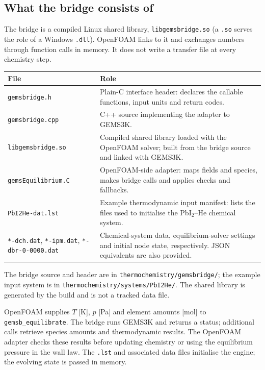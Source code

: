\documentclass[10pt,a4paper]{article}
\begin{document}
\clearpage
\subsection{What the bridge consists of}
The bridge is a compiled Linux shared library, \texttt{libgemsbridge.so}
(a \texttt{.so} serves the role of a Windows \texttt{.dll}). OpenFOAM links
to it and exchanges numbers through function calls in memory. It does
not write a transfer file at every chemistry step.

{\small
\renewcommand{\arraystretch}{1.3}
\begin{tabularx}{\textwidth}{@{}p{4.9cm}>{\raggedright\arraybackslash}X@{}}
\toprule
\textbf{File} & \textbf{Role} \\
\midrule
\texttt{gemsbridge.h} & Plain-C interface header: declares the callable functions, input units and return codes. \\
\texttt{gemsbridge.cpp} & C++ source implementing the adapter to GEMS3K. \\
\texttt{libgemsbridge.so} & Compiled shared library loaded with the OpenFOAM solver; built from the bridge source and linked with GEMS3K. \\
\texttt{gemsEquilibrium.C} & OpenFOAM-side adapter: maps fields and species, makes bridge calls and applies checks and fallbacks. \\
\texttt{PbI2He-dat.lst} & Example thermodynamic input manifest: lists the files used to initialise the PbI$_2$--He chemical system. \\
\texttt{*-dch.dat}, \texttt{*-ipm.dat},\newline
\texttt{*-dbr-0-0000.dat} & Chemical-system data, equilibrium-solver settings and initial node state, respectively. JSON equivalents are also provided. \\
\bottomrule
\end{tabularx}
}

The bridge source and header are in \texttt{thermochemistry/gemsbridge/};
the example input system is in \texttt{thermochemistry/systems/PbI2He/}.
The shared library is generated by the build and is not a tracked data file.

\begin{inshort}
OpenFOAM supplies $T$ [K], $p$ [Pa] and element amounts [mol] to
\texttt{gemsb\_equilibrate}. The bridge runs GEMS3K and returns a status;
additional calls retrieve species amounts and thermodynamic results.
The OpenFOAM adapter checks these results before updating chemistry or
using the equilibrium pressure in the wall law. The \texttt{.lst} and
associated data files initialise the engine; the evolving state is passed
in memory.
\end{inshort}
\end{document}
